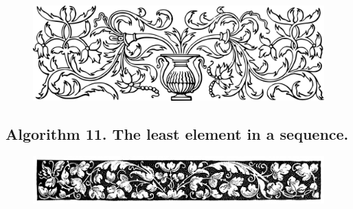 \documentclass[preview]{standalone}
\begin{document}
\begin{figure}[!h]
    \centering
    \includegraphics[width=14cm]{../resources/jpg/3.1.algorithms/border1.png}
\end{figure}
\subsection[The least element in a sequence.]{
    \color{section} Algorithm 11. \color{black} The least element in a sequence.
}
\vspace{-1\baselineskip}

\vspace{1\baselineskip}
\begin{center}
    
\end{center}
\vspace{1\baselineskip}
\begin{center}
    
\end{center}


\begin{figure}[!h]
    \centering
    \includegraphics[width=14cm]{../resources/jpg/3.1.algorithms/border2.jpg}
\end{figure}
\vspace{-1\baselineskip}
\end{document}
